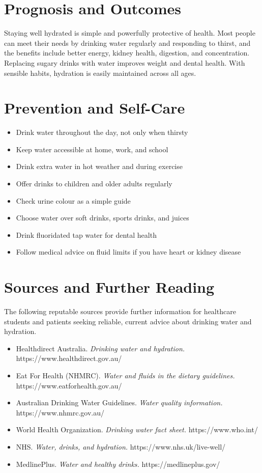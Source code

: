 \section*{Prognosis and Outcomes}
Staying well hydrated is simple and powerfully protective of health. Most people can meet their needs by drinking water regularly and responding to thirst, and the benefits include better energy, kidney health, digestion, and concentration. Replacing sugary drinks with water improves weight and dental health. With sensible habits, hydration is easily maintained across all ages.

\section*{Prevention and Self-Care}
\begin{itemize}
    \item Drink water throughout the day, not only when thirsty
    \item Keep water accessible at home, work, and school
    \item Drink extra water in hot weather and during exercise
    \item Offer drinks to children and older adults regularly
    \item Check urine colour as a simple guide
    \item Choose water over soft drinks, sports drinks, and juices
    \item Drink fluoridated tap water for dental health
    \item Follow medical advice on fluid limits if you have heart or kidney disease
\end{itemize}

\section*{Sources and Further Reading}
The following reputable sources provide further information for healthcare students and patients seeking reliable, current advice about drinking water and hydration.

\begin{itemize}
    \item Healthdirect Australia. \textit{Drinking water and hydration.} https://www.healthdirect.gov.au/
    \item Eat For Health (NHMRC). \textit{Water and fluids in the dietary guidelines.} https://www.eatforhealth.gov.au/
    \item Australian Drinking Water Guidelines. \textit{Water quality information.} https://www.nhmrc.gov.au/
    \item World Health Organization. \textit{Drinking water fact sheet.} https://www.who.int/
    \item NHS. \textit{Water, drinks, and hydration.} https://www.nhs.uk/live-well/
    \item MedlinePlus. \textit{Water and healthy drinks.} https://medlineplus.gov/
\end{itemize}
